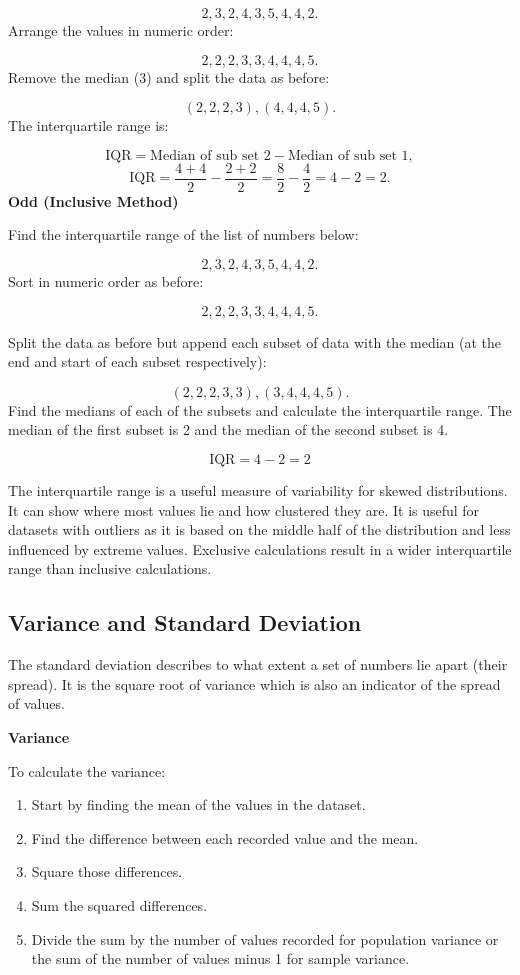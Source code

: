 \documentclass[
]{book}
\providecommand{\tightlist}{%
  \setlength{\itemsep}{0pt}\setlength{\parskip}{0pt}}
\begin{document}
\[2, 3, 2, 4, 3, 5, 4, 4, 2.\]
Arrange the values in numeric order:

\[2, 2, 2, 3, 3, 4, 4, 4, 5. \]
Remove the median (3) and split the data as before:

\[ (2, 2, 2, 3), (4, 4, 4, 5).\]
The interquartile range is:

\[ \textrm{IQR}=\textrm{Median of sub set 2}- \textrm{Median of sub set 1},\]
\[ \textrm{IQR}=\frac{4+4}{2} - \frac{2+2}{2}=\frac{8}{2} - \frac{4}{2} = 4 - 2= 2.\]
\textbf{Odd (Inclusive Method)}

Find the interquartile range of the list of numbers below:

\[ 2, 3, 2, 4, 3, 5, 4, 4, 2.\]
Sort in numeric order as before:

\[2, 2, 2, 3, 3, 4, 4, 4, 5.\]

Split the data as before but append each subset of data with the median (at the end and start of each subset respectively):

\[(2, 2, 2, 3, 3),(3, 4, 4, 4, 5).\]
Find the medians of each of the subsets and calculate the interquartile range. The median of the first subset is 2 and the median of the second subset is 4.

\[ \textrm{IQR} = 4 - 2 = 2 \]

The interquartile range is a useful measure of variability for skewed distributions. It can show where most values lie and how clustered they are. It is useful for datasets with outliers as it is based on the middle half of the distribution and less influenced by extreme values. Exclusive calculations result in a wider interquartile range than inclusive calculations.

\hypertarget{variance-and-standard-deviation}{%
\subsection{Variance and Standard Deviation}\label{variance-and-standard-deviation}}

The standard deviation describes to what extent a set of numbers lie apart (their spread). It is the square root of variance which is also an indicator of the spread of values.

\textbf{Variance}

To calculate the variance:

\begin{enumerate}
\def\labelenumi{\arabic{enumi}.}
\tightlist
\item
  Start by finding the mean of the values in the dataset.
\item
  Find the difference between each recorded value and the mean.
\item
  Square those differences.
\item
  Sum the squared differences.
\item
  Divide the sum by the number of values recorded for population variance or the sum of the number of values minus 1 for sample variance.
\end{enumerate}
\end{document}
